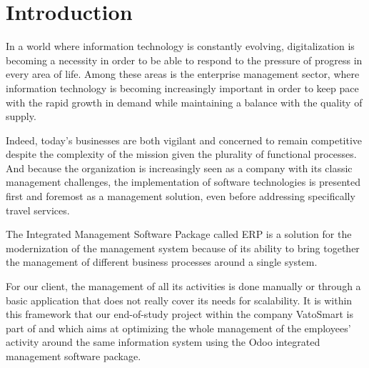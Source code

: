 \chapter*{Introduction}

In a world where information technology is constantly evolving, digitalization is becoming a necessity in order to be able to respond to the pressure of progress in every area of life.
Among these areas is the enterprise management sector, where information technology is becoming increasingly important in order to keep pace with the rapid growth in demand while maintaining a balance with the quality of supply.

Indeed, today's businesses are both vigilant and concerned to remain competitive despite the complexity of the mission given the plurality of functional processes. And because the organization is increasingly seen as a company with its classic management challenges, the implementation of software technologies is presented first and foremost as a management solution, even before addressing specifically travel services.

The Integrated Management Software Package called ERP is a solution for the modernization of the management system because of its ability to bring together the management of different business processes around a single system.

For our client, the management of all its activities is done manually or through a basic application that does not really cover its needs for scalability. It is within this framework that our end-of-study project within the company VatoSmart is part of and which aims at optimizing the whole management of the employees' activity around the same information system using the Odoo integrated management software package. 
